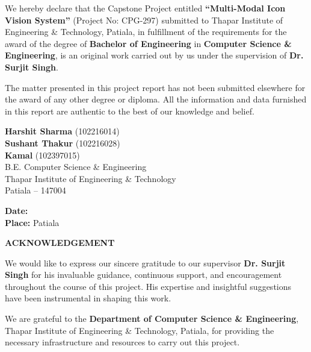 \documentclass[11pt,a4paper]{report}
\begin{document}
\noindent We hereby declare that the Capstone Project entitled \textbf{``Multi-Modal Icon Vision System''} (Project No: CPG-297) submitted to Thapar Institute of Engineering \& Technology, Patiala, in fulfillment of the requirements for the award of the degree of \textbf{Bachelor of Engineering} in \textbf{Computer Science \& Engineering}, is an original work carried out by us under the supervision of \textbf{Dr. Surjit Singh}.

\vspace{1cm}
\noindent The matter presented in this project report has not been submitted elsewhere for the award of any other degree or diploma. All the information and data furnished in this report are authentic to the best of our knowledge and belief.

\vspace{2cm}
\begin{flushright}
    \textbf{Harshit Sharma} (102216014)\\
    \textbf{Sushant Thakur} (102216028)\\
    \textbf{Kamal} (102397015)\\[0.5cm]
    B.E. Computer Science \& Engineering\\
    Thapar Institute of Engineering \& Technology\\
    Patiala -- 147004
\end{flushright}

\vspace{1.5cm}
\noindent\textbf{Date:} \underline{\hspace{3cm}}\\[0.5cm]
\noindent\textbf{Place:} Patiala

\newpage
\thispagestyle{empty}
\begin{center}
    {\Large\bfseries\color{tietnavy} ACKNOWLEDGEMENT}\\[1cm]
\end{center}

\noindent We would like to express our sincere gratitude to our supervisor \textbf{Dr. Surjit Singh} for his invaluable guidance, continuous support, and encouragement throughout the course of this project. His expertise and insightful suggestions have been instrumental in shaping this work.

\vspace{0.5cm}
\noindent We are grateful to the \textbf{Department of Computer Science \& Engineering}, Thapar Institute of Engineering \& Technology, Patiala, for providing the necessary infrastructure and resources to carry out this project.
\end{document}
